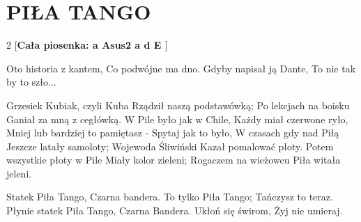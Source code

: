 \documentclass[../../../songbook.tex]{subfiles}
\begin{document}
\TabPositions{8cm} %
\section*{PIŁA TANGO}
{}
\vspace{0.5cm}
\setlength{\columnsep}{0.1cm}
\begin{multicols}{2}
[\textbf{Cała piosenka: {\color{red}  a Asus2 a d E  }} 
]
{\footnotesize
Oto historia z kantem,	\newline
Co podwójne ma dno.	\newline
Gdyby napisał ją Dante,	\newline
To nie tak by to szło...	\newline

Grzesiek Kubiak, czyli Kuba 	\newline
Rządził naszą podstawówką;	\newline
Po lekcjach na boisku 	\newline
Ganiał za mną z cegłówką.	\newline
W Pile było jak w Chile,	\newline
Każdy miał czerwone ryło,	\newline
Mniej lub bardziej to pamiętasz 	\newline- 
Spytaj jak to było,	\newline
W czasach gdy nad Piłą 	\newline
Jeszcze latały samoloty;	\newline
Wojewoda Śliwiński 	\newline
Kazał pomalować płoty.	\newline
Potem wszystkie płoty w Pile 	\newline
Miały kolor zieleni;	\newline
Rogaczem na wieżowcu 	\newline
Piła witała jeleni.	\newline

\-\hspace{0.5cm} Statek Piła Tango,	\newline
\-\hspace{0.5cm} Czarna bandera.	\newline
\-\hspace{0.5cm} To tylko Piła Tango;	\newline
\-\hspace{0.5cm} Tańczysz to teraz.	\newline
\-\hspace{0.5cm} Płynie statek Piła Tango,	\newline
\-\hspace{0.5cm} Czarna Bandera.	\newline
\-\hspace{0.5cm} Ukłoń się świrom,	\newline
\-\hspace{0.5cm} Żyj nie umieraj.	\newline

}
\end{multicols}
\end{document}
